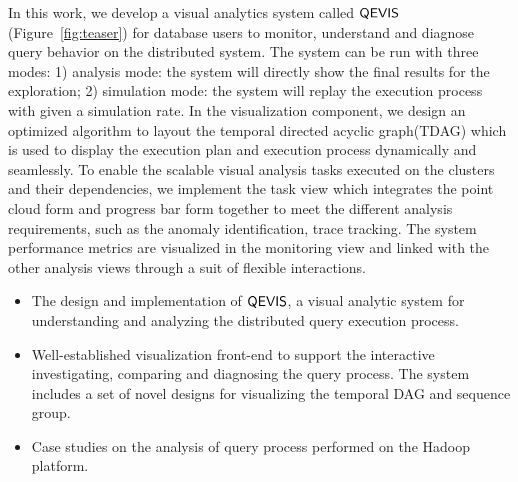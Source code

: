 In this work, we develop a visual analytics system called $\mathsf{QEVIS}$ (Figure~\ref{fig:teaser}) for database users to monitor, understand and diagnose query behavior on the distributed system. The system can be run with three modes: 1) analysis mode: the system will directly show the final results for the exploration; 2) simulation mode: the system will replay the execution process with given a simulation rate. In the visualization component, we design an optimized algorithm to layout the temporal directed acyclic graph(TDAG) which is used to display the execution plan and execution process dynamically and seamlessly. To enable the scalable visual analysis tasks executed on the clusters and their dependencies, we implement the task view which integrates the point cloud form and progress bar form together to meet the different analysis requirements, such as the anomaly identification, trace tracking. The system performance metrics are visualized in the monitoring view and linked with the other analysis views through a suit of flexible interactions. 


\begin{itemize}
\item The design and implementation of $\mathsf{QEVIS}$, a visual analytic system for understanding and analyzing the distributed query execution process.
\item Well-established visualization front-end to support the interactive investigating, comparing and diagnosing the query process. The system includes a set of novel designs for visualizing the temporal DAG and sequence group.
\item Case studies on the analysis of query process performed on the Hadoop platform.
\end{itemize}